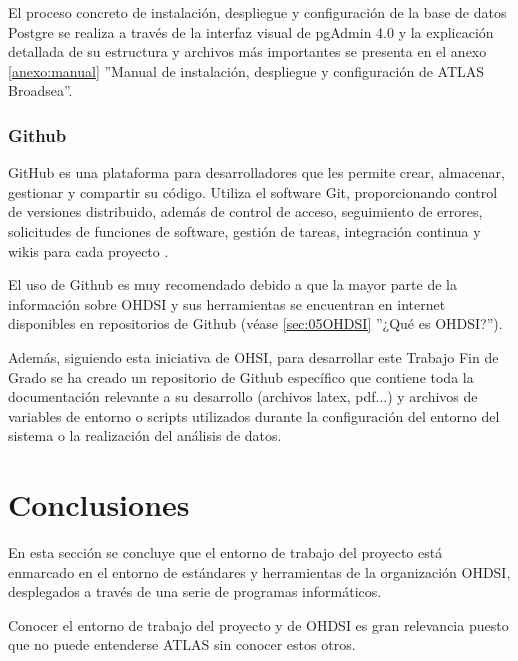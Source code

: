 El proceso concreto de instalación, despliegue y configuración de la base de datos Postgre se realiza a través de la interfaz visual de pgAdmin 4.0 \parencite{pgAdminWebsite} y la explicación detallada de su estructura y archivos más importantes se presenta en el anexo \ref{anexo:manual} ''Manual de instalación, despliegue y configuración de ATLAS Broadsea''.

\subsubsection{Github}

GitHub es una plataforma para desarrolladores que les permite crear, almacenar, gestionar y compartir su código. Utiliza el software Git, proporcionando control de versiones distribuido, además de control de acceso, seguimiento de errores, solicitudes de funciones de software, gestión de tareas, integración continua y wikis para cada proyecto \parencite{GithubWikipedia}.

El uso de Github es muy recomendado debido a que la mayor parte de la información sobre OHDSI y sus herramientas se encuentran en internet disponibles en repositorios de Github (véase \ref{sec:05OHDSI} ''¿Qué es OHDSI?''). 

Además, siguiendo esta iniciativa de OHSI, para desarrollar este Trabajo Fin de Grado se ha creado un repositorio de Github específico \parencite{vallealonsodc} que contiene toda la documentación relevante a su desarrollo (archivos latex, pdf...) y archivos de variables de entorno o scripts utilizados durante la configuración del entorno del sistema o la realización del análisis de datos.   


\section{Conclusiones} \label{sec:07conclusiones}

En esta sección se concluye que el entorno de trabajo del proyecto está enmarcado en el entorno de estándares y herramientas de la organización OHDSI, desplegados a través de una serie de programas informáticos. 

Conocer el entorno de trabajo del proyecto y de OHDSI es gran relevancia puesto que no puede entenderse ATLAS sin conocer estos otros. 
